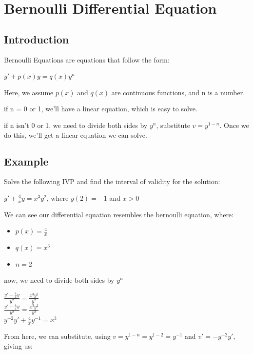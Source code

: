 \documentclass{article}
\begin{document}
\section{Bernoulli Differential Equation}
\subsection{Introduction}
Bernoulli Equations are equations that follow the form:

\begin{center}
    $y' + p(x)y = q(x)y^n$
\end{center}

Here, we assume $p(x)$ and $q(x)$ are continuous functions, and n is a number.

if n = 0 or 1, we'll have a linear equation, which is easy to solve.

if n isn't 0 or 1, we need to divide both sides by $y^n$, substitute $v = y^{1 - n}$. Once we do this, we'll get a linear equation we can solve.

\subsection{Example}

Solve the following IVP and find the interval of validity for the solution:

\begin{center}
    $y' + \frac{4}{x} y = x^3 y^2$, where $y(2) = -1$ and $x > 0$
\end{center}

We can see our differential equation resembles the bernoulli equation, where:

\begin{itemize}
    \item $p(x) = \frac{4}{x}$
    \item $q(x) = x^3$
    \item $n = 2$
\end{itemize}

now, we need to divide both sides by $y^n$

\begin{center}
    $\frac{y' + \frac{4}{x} y}{y^2} = \frac{x^3 y^2}{y^2}$ \\
    $\frac{y' + \frac{4}{x} y}{y^2} = \frac{x^3 y^2}{y^2}$ \\
    $y^{-2} y' + \frac{4}{x} y^{-1} = x^3$
\end{center}


From here, we can substitute, using $v = y^{1 - n} = y^{1 - 2} = y^{-1}$ and $v' = -y^{-2} y'$, giving us:
\end{document}
